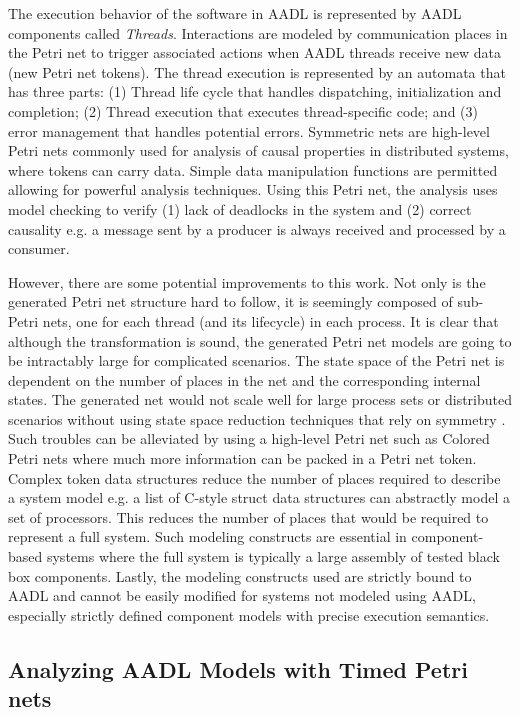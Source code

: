 The execution behavior of the software in AADL is represented by AADL components called \emph{Threads}. Interactions are modeled by communication places in the Petri net to trigger associated actions when AADL threads receive new data (new Petri net tokens). The thread execution is represented by an automata that has three parts: (1) Thread life cycle that handles dispatching, initialization and completion; (2) Thread execution that executes thread-specific code; and (3) error management that handles potential errors. Symmetric nets are high-level Petri nets commonly used for analysis of causal properties in distributed systems, where tokens can carry data. Simple data manipulation functions are permitted allowing for powerful analysis techniques. Using this Petri net, the analysis uses model checking to verify (1) lack of deadlocks in the system and (2) correct causality e.g. a message sent by a producer is always received and processed by a consumer. 

However, there are some potential improvements to this work. Not only is the generated Petri net structure hard to follow, it is seemingly composed of sub-Petri nets, one for each thread (and its lifecycle) in each process. It is clear that although the transformation is sound, the generated Petri net models are going to be intractably large for complicated scenarios. The state space of the Petri net is dependent on the number of places in the net and the corresponding internal states. The generated net would not scale well for large process sets or distributed scenarios without using state space reduction techniques that rely on symmetry \cite{sistla2004symmetry}. Such troubles can be alleviated by using a high-level Petri net such as Colored Petri nets where much more information can be packed in a Petri net token. Complex token data structures reduce the number of places required to describe a system model e.g. a list of C-style struct data structures can abstractly model a set of processors. This reduces the number of places that would be required to represent a full system. Such modeling constructs are essential in component-based systems where the full system is typically a large assembly of tested black box components. Lastly, the modeling constructs used are strictly bound to AADL and cannot be easily modified for systems not modeled using AADL, especially strictly defined component models with precise execution semantics. 

\subsection{Analyzing AADL Models with Timed Petri nets}

